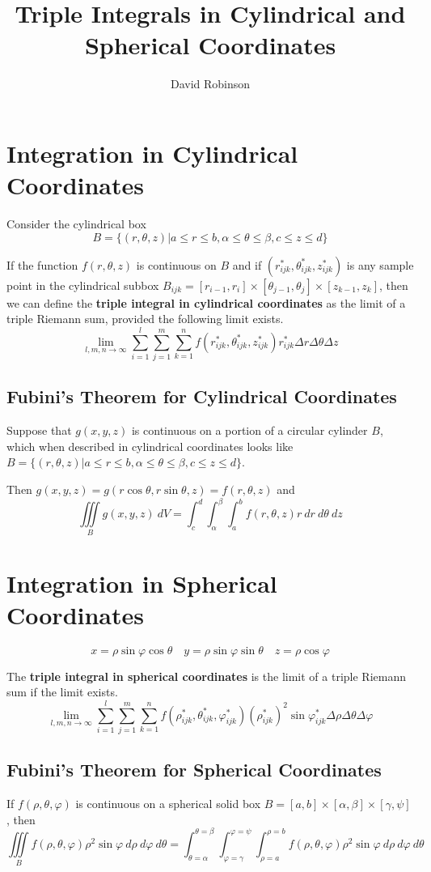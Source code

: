 \documentclass{article}
\title{Triple Integrals in Cylindrical and Spherical Coordinates}
\author{David Robinson}
\date{}
\begin{document}
\maketitle

\section*{Integration in Cylindrical Coordinates}

Consider the cylindrical box
\[B=\{(r,\theta,z)|a\leq r\leq b, \alpha\leq\theta\leq\beta, c\leq z\leq d\}\]

If the function $f(r,\theta,z)$ is continuous on $B$ and if $(r_{ijk}^*,\theta_{ijk}^*,z_{ijk}^*)$ is any sample point in the cylindrical subbox $B_{ijk}=[r_{i-1},r_i]\times [\theta_{j-1},\theta_j]\times [z_{k-1},z_k]$, then we can define the \textbf{triple integral in cylindrical coordinates} as the limit of a triple Riemann sum, provided the following limit exists.
\[\lim_{l,m,n\rightarrow\infty}\sum_{i=1}^l\sum_{j=1}^m\sum_{k=1}^n f(r_{ijk}^*,\theta_{ijk}^*,z_{ijk}^*)r_{ijk}^*\Delta r\Delta\theta\Delta z\]

\subsection{Fubini's Theorem for Cylindrical Coordinates}
Suppose that $g(x,y,z)$ is continuous on a portion of a circular cylinder $B$, which when described in cylindrical coordinates looks like $B=\{(r,\theta,z)|a\leq r\leq b,\alpha\leq\theta\leq\beta,c\leq z\leq d\}$.
\vspace{1em}

Then $g(x,y,z)=g(r\cos\theta,r\sin\theta,z)=f(r,\theta,z)$ and
\[\iiint\limits_B g(x,y,z)\: dV=\int_c^d\int_\alpha^\beta\int_a^b f(r,\theta,z)r\: dr\: d\theta\: dz\]

\section{Integration in Spherical Coordinates}
\[x=\rho\sin\varphi\cos\theta\quad y=\rho\sin\varphi\sin\theta\quad z=\rho\cos\varphi\]

The \textbf{triple integral in spherical coordinates} is the limit of a triple Riemann sum if the limit exists.
\[\lim_{l,m,n\rightarrow\infty}\sum_{i=1}^l\sum_{j=1}^m\sum_{k=1}^n f(\rho_{ijk}^*,\theta_{ijk}^*,\varphi_{ijk}^*){(\rho_{ijk}^*)}^2\sin\varphi_{ijk}^*\Delta\rho\Delta\theta\Delta\varphi\]

\subsection{Fubini's Theorem for Spherical Coordinates}
If $f(\rho,\theta,\varphi)$ is continuous on a spherical solid box $B=[a,b]\times[\alpha,\beta]\times[\gamma,\psi]$, then
\[\iiint\limits_B f(\rho,\theta,\varphi)\rho^2\sin\varphi\: d\rho\: d\varphi\: d\theta=\int_{\theta=\alpha}^{\theta=\beta}\int_{\varphi=\gamma}^{\varphi=\psi}\int_{\rho=a}^{\rho=b} f(\rho,\theta,\varphi)\rho^2\sin\varphi\: d\rho\: d\varphi\: d\theta\]
\end{document}
